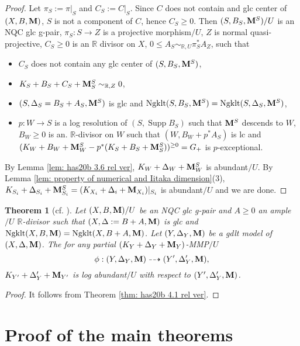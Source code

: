 \documentclass[11pt]{amsart}
\numberwithin{equation}{section}
\newcommand{\Mm}{{\bf{M}}}
\newcommand{\Rr}{\mathbb{R}}
\newcommand{\Supp}{\operatorname{Supp}}
\newcommand{\Ngklt}{\operatorname{Ngklt}}
\newtheorem{thm}{Theorem}[section]
\theoremstyle{definition}
\theoremstyle{definition}
\theoremstyle{definition}
\begin{document}
\begin{proof}
Let $\pi_S:=\pi|_S$ and $C_S:=C|_S$. Since $C$ does not contain and glc center of $(X,B,\Mm)$, $S$ is not a component of $C$, hence $C_S\geq 0$. Then $(S,B_S,\Mm^S)/U$ is an NQC glc g-pair, $\pi_S: S\rightarrow Z$ is a projective morphism$/U$, $Z$ is normal quasi-projective, $C_S\geq 0$ is an $\Rr$ divisor on $X$, $0\leq A_S\sim_{\Rr,U}\pi_S^*A_Z$, such that
\begin{itemize}
    \item $C_S$ does not contain any glc center of $(S,B_S,\Mm^S)$,
    \item $K_S+B_S+C_S+\Mm^S_S\sim_{\Rr,Z}0$,
    \item $(S,\Delta_S=B_S+A_S,\Mm^S)$ is glc and $\Ngklt(S,B_S,\Mm^S)=\Ngklt(S,\Delta_S,\Mm^S)$,
    \item $p: W\rightarrow S$ is a log resolution of $(S,\Supp B_S)$ such that $\Mm^S$ descends to $W$, $B_W\geq 0$ is an. $\Rr$-divisor on $W$ such that $(W,B_W+p^*A_S)$ is lc and $(K_W+B_W+\Mm^S_W-p^*(K_S+B_S+\Mm^S_S))^{\geq 0}=G_+$ is $p$-exceptional. 
\end{itemize}
By Lemma \ref{lem: has20b 3.6 rel ver}, $K_W+\Delta_W+\Mm^S_W$ is abundant$/U$. By Lemma \ref{lem: property of numerical and Iitaka dimension}(3), $K_{S_i}+\Delta_{S_i}+\Mm^S_{S_i}=(K_{X_i}+\Delta_i+\Mm_{X_i})|_{S_i}$ is abundant$/U$ and we are done.
\end{proof}


\begin{thm}[{cf. \cite[Theroem 1.3]{Has20b}}]\label{thm: has20b 1.3 rel ver}
Let $(X,B,\Mm)/U$ be an NQC glc g-pair and $A\geq 0$ an ample$/U$ $\Rr$-divisor such that $(X,\Delta:=B+A,\Mm)$ is glc and $\Ngklt(X,B,\Mm)=\Ngklt(X,B+A,\Mm)$. Let $(Y,\Delta_Y,\Mm)$ be a gdlt model of $(X,\Delta,\Mm)$. The for any partial $(K_Y+\Delta_Y+\Mm_Y)$-MMP$/U$
$$\phi:(Y,\Delta_Y,\Mm)\dashrightarrow (Y',\Delta_Y',\Mm),$$
$K_{Y'}+\Delta_Y'+\Mm_{Y'}$ is log abundant$/U$ with respect to $(Y',\Delta_Y',\Mm)$.
\end{thm}
\begin{proof}
It follows from Theorem \ref{thm: has20b 4.1 rel ver}.
\end{proof}

\section{Proof of the main theorems}
\end{document}
